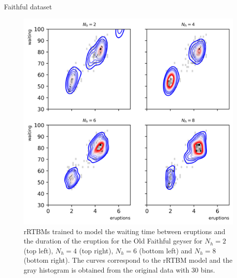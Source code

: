 \documentclass[10pt]{beamer}
\begin{document}
\begin{frame}{Faithful dataset}

    \begin{figure}
        \includegraphics[scale=0.7]{figures/faithful.png}
       
            \caption{\scriptsize rRTBMs trained to model the waiting time between eruptions and the duration of the eruption for the Old Faithful geyser for $N_h = 2$ (top left), $N_h = 4$ (top right), $N_h = 6$ (bottom left) and $N_h = 8$ (bottom right).
            The curves correspond to the rRTBM model and the gray histogram is obtained from the original data with 30 bins.}
    \end{figure}
    
    
\end{frame}
\end{document}
